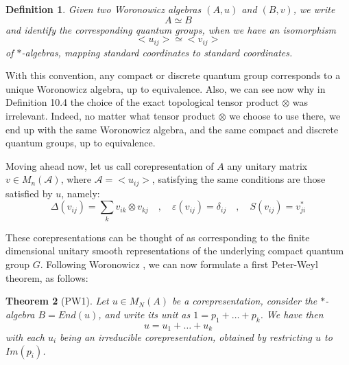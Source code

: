 \documentclass[12pt]{amsbook}
\newtheorem{theorem}{Theorem}[chapter]
\newtheorem{definition}[theorem]{Definition}
\begin{document}
\begin{definition}
Given two Woronowicz algebras $(A,u)$ and $(B,v)$, we write 
$$A\simeq B$$
and identify the corresponding quantum groups, when we have an isomorphism 
$$<u_{ij}>\simeq<v_{ij}>$$
of $*$-algebras, mapping standard coordinates to standard coordinates.
\end{definition}

With this convention, any compact or discrete quantum group corresponds to a unique Woronowicz algebra, up to equivalence. Also, we can see now why in Definition 10.4 the choice of the exact topological tensor product $\otimes$ was irrelevant. Indeed, no matter what tensor product $\otimes$ we choose to use there, we end up with the same Woronowicz algebra, and the same compact and discrete quantum groups, up to equivalence. 

\bigskip

Moving ahead now, let us call corepresentation of $A$ any unitary matrix $v\in M_n(\mathcal A)$, where $\mathcal A=<u_{ij}>$, satisfying the same conditions are those satisfied by $u$, namely:
$$\Delta(v_{ij})=\sum_kv_{ik}\otimes v_{kj}\quad,\quad 
\varepsilon(v_{ij})=\delta_{ij}\quad,\quad 
S(v_{ij})=v_{ji}^*$$


These corepresentations can be thought of as corresponding to the finite dimensional unitary smooth representations of the underlying compact quantum group $G$. Following Woronowicz \cite{wo1}, we can now formulate a first Peter-Weyl theorem, as follows:


\begin{theorem}[PW1]
Let $u\in M_N(A)$ be a corepresentation, consider the $*$-algebra $B=End(u)$, and write its unit as $1=p_1+\ldots+p_k$. We have then
$$u=u_1+\ldots+u_k$$
with each $u_i$ being an irreducible corepresentation, obtained by restricting $u$ to $Im(p_i)$.
\end{theorem}
\end{document}
